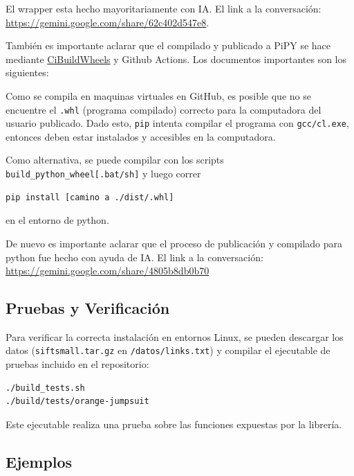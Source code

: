 El wrapper esta hecho mayoritariamente con IA. El link a la conversaci\'on:
\url{https://gemini.google.com/share/62c402d547e8}.

\newpage

Tambi\'en es importante aclarar que el compilado y publicado a PiPY se hace 
mediante \href{https://cibuildwheel.pypa.io/en/stable/}{CiBuildWheels} y Github 
Actions. Los documentos importantes son los siguientes: 


Como se compila en maquinas virtuales en GitHub, es posible que no se encuentre
el \texttt{.whl} (programa compilado) correcto para la computadora del usuario
publicado. 
Dado esto, \texttt{pip} intenta compilar el programa con 
\texttt{gcc/cl.exe}, entonces deben estar instalados y accesibles en la computadora.

Como alternativa, se puede compilar con los scripts 
\texttt{build\_python\_wheel[.bat/sh]} y luego correr 
\begin{lstlisting}[language=bash]
pip install [camino a ./dist/.whl]
\end{lstlisting}
en el entorno de python.

De nuevo es importante aclarar que el proceso de publicaci\'on y compilado para 
python fue hecho con ayuda de IA. El link a la conversaci\'on: 
\url{https://gemini.google.com/share/4805b8db0b70}

\subsection{Pruebas y Verificaci\'on}

Para verificar la correcta instalaci\'on en entornos Linux, 
se pueden descargar los datos (\texttt{siftsmall.tar.gz} en 
\texttt{/datos/links.txt})
y compilar el ejecutable de pruebas incluido en el repositorio:

\begin{lstlisting}[language=bash]
./build_tests.sh
./build/tests/orange-jumpsuit
\end{lstlisting}

Este ejecutable realiza una prueba sobre las funciones expuestas por la 
librer\'ia.

\newpage

\subsection{Ejemplos}

